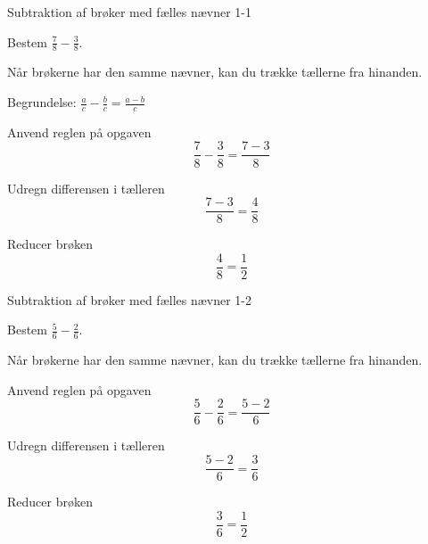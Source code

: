 \documentclass{article}
\begin{document}

\tableofcontents
\newpage

\begin{exercise}{Subtraktion af brøker med fælles nævner 1-1}

Bestem $\frac{7}{8} - \frac{3}{8}$.


\hint

Når brøkerne har den samme nævner, kan du trække tællerne fra hinanden.

\hint

Begrundelse: $\frac{a}{c} - \frac{b}{c} = \frac{a - b}{c}$

\hint

Anvend reglen på opgaven
\[
\frac{7}{8} - \frac{3}{8} = \frac{7 - 3}{8}
\]

\hint

Udregn differensen i tælleren
\[
\frac{7 - 3}{8} = \frac{4}{8}
\]

\hint

Reducer brøken
\[
\frac{4}{8} = \frac{1}{2}
\]

\end{exercise}

\newpage

\begin{exercise}{Subtraktion af brøker med fælles nævner 1-2}

Bestem $\frac{5}{6} - \frac{2}{6}$.


\hint

Når brøkerne har den samme nævner, kan du trække tællerne fra hinanden.

\hint

Anvend reglen på opgaven
\[
\frac{5}{6} - \frac{2}{6} = \frac{5 - 2}{6}
\]

\hint

Udregn differensen i tælleren
\[
\frac{5 - 2}{6} = \frac{3}{6}
\]

\hint

Reducer brøken
\[
\frac{3}{6} = \frac{1}{2}
\]

\end{exercise}

\newpage
\end{document}
